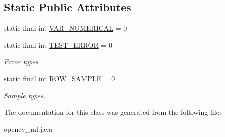 \subsection*{Static Public Attributes}
\begin{DoxyCompactItemize}
\item 
static final int \hyperlink{group__ml_ga4e7d272fa71d294a93e6a89edeacdec8}{V\+A\+R\+\_\+\+N\+U\+M\+E\+R\+I\+C\+AL} = 0
\item 
static final int \hyperlink{group__ml_gab8408e7a56e10d19a84684bb008d0e9f}{T\+E\+S\+T\+\_\+\+E\+R\+R\+OR} = 0
\begin{DoxyCompactList}\small\item\em Error types \end{DoxyCompactList}\item 
static final int \hyperlink{group__ml_gaa71abe7b3688e0e9b0b79af6e224286e}{R\+O\+W\+\_\+\+S\+A\+M\+P\+LE} = 0
\begin{DoxyCompactList}\small\item\em Sample types. \end{DoxyCompactList}\end{DoxyCompactItemize}


The documentation for this class was generated from the following file\+:\begin{DoxyCompactItemize}
\item 
opencv\+\_\+ml.\+java\end{DoxyCompactItemize}
